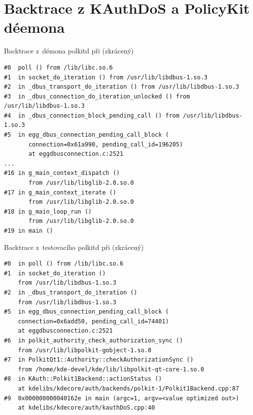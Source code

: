 \chapter{Backtrace z KAuthDoS a PolicyKit déemona}
\begin{mylisting}
\caption{Backtrace z~démona polkitd při  (zkrácený)}
\label{btrac1}
\begin{lstlisting}
#0  poll () from /lib/libc.so.6
#1  in socket_do_iteration () from /usr/lib/libdbus-1.so.3
#2  in _dbus_transport_do_iteration () from /usr/lib/libdbus-1.so.3
#3  in _dbus_connection_do_iteration_unlocked () from /usr/lib/libdbus-1.so.3
#4  in _dbus_connection_block_pending_call () from /usr/lib/libdbus-1.so.3
#5  in egg_dbus_connection_pending_call_block (
       connection=0x61a990, pending_call_id=196205)
       at eggdbusconnection.c:2521
...      
#16 in g_main_context_dispatch ()
       from /usr/lib/libglib-2.0.so.0
#17 in g_main_context_iterate ()
       from /usr/lib/libglib-2.0.so.0
#18 in g_main_loop_run ()
       from /usr/lib/libglib-2.0.so.0
#19 in main ()
\end{lstlisting}
\end{mylisting}

\begin{mylisting}
\caption{Backtrace z~testovacího polkitd při  (zkrácený)}
\label{btrac2}
\begin{lstlisting}
#0  in poll () from /lib/libc.so.6
#1  in socket_do_iteration ()
    from /usr/lib/libdbus-1.so.3
#2  in _dbus_transport_do_iteration ()
    from /usr/lib/libdbus-1.so.3
#5  in egg_dbus_connection_pending_call_block (
    connection=0x6add50, pending_call_id=74401)
    at eggdbusconnection.c:2521
#6  in polkit_authority_check_authorization_sync ()
    from /usr/lib/libpolkit-gobject-1.so.0
#7  in PolkitQt1::Authority::checkAuthorizationSync ()
    from /home/kde-devel/kde/lib/libpolkit-qt-core-1.so.0
#8  in KAuth::Polkit1Backend::actionStatus ()
    at kdelibs/kdecore/auth/backends/polkit-1/Polkit1Backend.cpp:87
#9  0x000000000040162e in main (argc=1, argv=<value optimized out>)
    at kdelibs/kdecore/auth/kauthDoS.cpp:40 
\end{lstlisting}
\end{mylisting}
